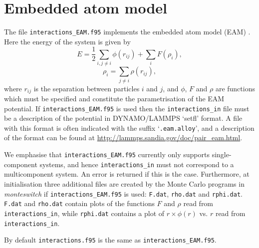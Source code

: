 \documentclass{report}
\begin{document}
\section{Embedded atom model}\label{sec:EAM}
The file \texttt{interactions\_EAM.f95} implements the embedded atom model (EAM) \cite{Daw_1984}. Here the energy of the system 
is given by
\begin{equation}
E = \frac{1}{2}\sum_{i,j\neq i}\phi(r_{ij}) + \sum_iF(\rho_i),
\end{equation}
\begin{equation}
\rho_i=\sum_{j\neq i}\rho(r_{ij}),
\end{equation}
where $r_{ij}$ is the separation between particles $i$ and $j$, and $\phi$, $F$ and $\rho$ are functions which must be specified
and constitute the parametrisation of the EAM potential. If \texttt{interactions\_EAM.f95} is used then the \texttt{interactions\_in}
file must be a description of the potential in DYNAMO/LAMMPS `setfl' format. A file with this format is often indicated with the 
suffix `\texttt{.eam.alloy}', and a description of the format can be found at \url{http://lammps.sandia.gov/doc/pair\_eam.html}. 

We emphasise that \texttt{interactions\_EAM.f95} currently only supports single-component systems, and hence \texttt{interactions\_in} must 
not correspond to a multicomponent system. An error is returned if this is the case. Furthermore, at initialisation three additional files are 
created by the
Monte Carlo programs in \emph{monteswitch} if \texttt{interactions\_EAM.f95} is used: \texttt{F.dat}, \texttt{rho.dat} and \texttt{rphi.dat}. 
\texttt{F.dat} and \texttt{rho.dat} contain plots of the functions $F$ and $\rho$ read from \texttt{interactions\_in}, while 
\texttt{rphi.dat} contains a plot of $r\times\phi(r)$ vs. $r$ read from \texttt{interactions\_in}. 

By default \texttt{interactions.f95} is the same as \texttt{interactions\_EAM.f95}.
\end{document}
